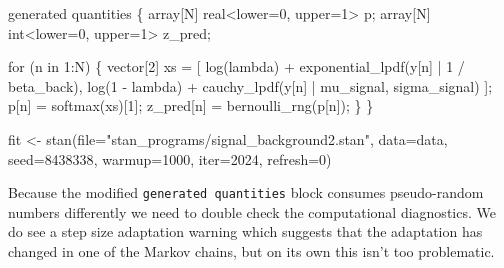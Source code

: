 \documentclass[
  letterpaper,
  DIV=11,
  numbers=noendperiod]{scrartcl}
\newenvironment{Shaded}{\begin{snugshade}}{\end{snugshade}}
\newcommand{\AttributeTok}[1]{\textcolor[rgb]{0.40,0.45,0.13}{#1}}
\newcommand{\ControlFlowTok}[1]{\textcolor[rgb]{0.00,0.23,0.31}{#1}}
\newcommand{\DataTypeTok}[1]{\textcolor[rgb]{0.68,0.00,0.00}{#1}}
\newcommand{\DecValTok}[1]{\textcolor[rgb]{0.68,0.00,0.00}{#1}}
\newcommand{\FunctionTok}[1]{\textcolor[rgb]{0.28,0.35,0.67}{#1}}
\newcommand{\KeywordTok}[1]{\textcolor[rgb]{0.00,0.23,0.31}{#1}}
\newcommand{\NormalTok}[1]{\textcolor[rgb]{0.00,0.23,0.31}{#1}}
\newcommand{\OtherTok}[1]{\textcolor[rgb]{0.00,0.23,0.31}{#1}}
\newcommand{\SpecialCharTok}[1]{\textcolor[rgb]{0.37,0.37,0.37}{#1}}
\newcommand{\StringTok}[1]{\textcolor[rgb]{0.13,0.47,0.30}{#1}}
\begin{document}
\begin{codelisting}
\begin{Shaded}
\begin{Highlighting}[]
\KeywordTok{generated quantities}\NormalTok{ \{}
  \DataTypeTok{array}\NormalTok{[N] }\DataTypeTok{real}\NormalTok{\textless{}}\KeywordTok{lower}\NormalTok{=}\DecValTok{0}\NormalTok{, }\KeywordTok{upper}\NormalTok{=}\DecValTok{1}\NormalTok{\textgreater{} p;}
  \DataTypeTok{array}\NormalTok{[N] }\DataTypeTok{int}\NormalTok{\textless{}}\KeywordTok{lower}\NormalTok{=}\DecValTok{0}\NormalTok{, }\KeywordTok{upper}\NormalTok{=}\DecValTok{1}\NormalTok{\textgreater{} z\_pred;}

  \ControlFlowTok{for}\NormalTok{ (n }\ControlFlowTok{in} \DecValTok{1}\NormalTok{:N) \{}
    \DataTypeTok{vector}\NormalTok{[}\DecValTok{2}\NormalTok{] xs = [   log(lambda)}
\NormalTok{                     + exponential\_lpdf(y[n] | }\DecValTok{1}\NormalTok{ / beta\_back),}
\NormalTok{                       log(}\DecValTok{1}\NormalTok{ {-} lambda)}
\NormalTok{                     + cauchy\_lpdf(y[n] | mu\_signal, sigma\_signal) ]\textquotesingle{};}
\NormalTok{    p[n] = softmax(xs)[}\DecValTok{1}\NormalTok{];}
\NormalTok{    z\_pred[n] = bernoulli\_rng(p[n]);}
\NormalTok{  \}}
\NormalTok{\}}
\end{Highlighting}
\end{Shaded}

\end{codelisting}

\begin{Shaded}
\begin{Highlighting}[]
\NormalTok{fit }\OtherTok{\textless{}{-}} \FunctionTok{stan}\NormalTok{(}\AttributeTok{file=}\StringTok{"stan\_programs/signal\_background2.stan"}\NormalTok{,}
            \AttributeTok{data=}\NormalTok{data, }\AttributeTok{seed=}\DecValTok{8438338}\NormalTok{,}
            \AttributeTok{warmup=}\DecValTok{1000}\NormalTok{, }\AttributeTok{iter=}\DecValTok{2024}\NormalTok{, }\AttributeTok{refresh=}\DecValTok{0}\NormalTok{)}
\end{Highlighting}
\end{Shaded}

Because the modified \texttt{generated\ quantities} block consumes
pseudo-random numbers differently we need to double check the
computational diagnostics. We do see a step size adaptation warning
which suggests that the adaptation has changed in one of the Markov
chains, but on its own this isn't too problematic.

\begin{Shaded}
\end{Shaded}
\end{document}
